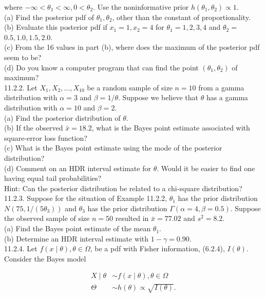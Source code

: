 where $-\infty<\theta_{1}<\infty, 0<\theta_{2}$. Use the noninformative prior $h\left(\theta_{1}, \theta_{2}\right) \propto 1$.\\
(a) Find the posterior pdf of $\theta_{1}, \theta_{2}$, other than the constant of proportionality.\\
(b) Evaluate this posterior pdf if $x_{1}=1, x_{2}=4$ for $\theta_{1}=1,2,3,4$ and $\theta_{2}=$ $0.5,1.0,1.5,2.0$.\\
(c) From the 16 values in part (b), where does the maximum of the posterior pdf seem to be?\\
(d) Do you know a computer program that can find the point $\left(\theta_{1}, \theta_{2}\right)$ of maximum?\\
11.2.2. Let $X_{1}, X_{2}, \ldots, X_{10}$ be a random sample of size $n=10$ from a gamma distribution with $\alpha=3$ and $\beta=1 / \theta$. Suppose we believe that $\theta$ has a gamma distribution with $\alpha=10$ and $\beta=2$.\\
(a) Find the posterior distribution of $\theta$.\\
(b) If the observed $\bar{x}=18.2$, what is the Bayes point estimate associated with square-error loss function?\\
(c) What is the Bayes point estimate using the mode of the posterior distribution?\\
(d) Comment on an HDR interval estimate for $\theta$. Would it be easier to find one having equal tail probabilities?\\
Hint: Can the posterior distribution be related to a chi-square distribution?\\
11.2.3. Suppose for the situation of Example 11.2.2, $\theta_{1}$ has the prior distribution $N\left(75,1 /\left(5 \theta_{3}\right)\right)$ and $\theta_{3}$ has the prior distribution $\Gamma(\alpha=4, \beta=0.5)$. Suppose the observed sample of size $n=50$ resulted in $\bar{x}=77.02$ and $s^{2}=8.2$.\\
(a) Find the Bayes point estimate of the mean $\theta_{1}$.\\
(b) Determine an HDR interval estimate with $1-\gamma=0.90$.\\
11.2.4. Let $f(x \mid \theta), \theta \in \Omega$, be a pdf with Fisher information, (6.2.4), $I(\theta)$. Consider the Bayes model


\begin{align*}
X \mid \theta & \sim f(x \mid \theta), \theta \in \Omega \\
\Theta & \sim h(\theta) \propto \sqrt{I(\theta)} . \tag{11.2.2}
\end{align*}


